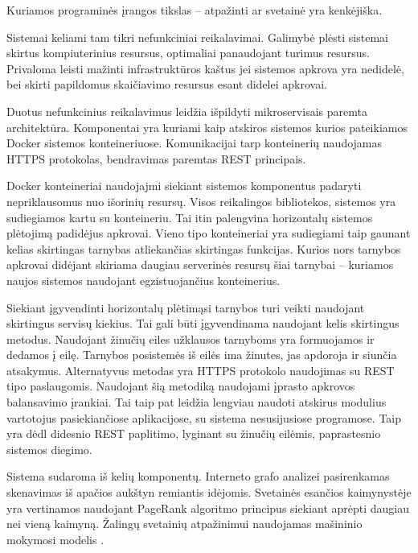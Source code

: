 
Kuriamos programinės įrangos tikslas -- atpažinti ar svetainė yra kenkėjiška.

Sistemai keliami tam tikri nefunkciniai reikalavimai. Galimybė plėsti sistemai skirtus kompiuterinius resursus, optimaliai
panaudojant turimus resursus. Privaloma leisti mažinti infrastruktūros kaštus jei sistemos apkrova yra nedidelė, bei
skirti papildomus skaičiavimo resursus esant didelei apkrovai.

Duotus nefunkcinius reikalavimus leidžia išpildyti mikroservisais paremta architektūra. Komponentai yra kuriami kaip
atskiros sistemos kurios pateikiamos Docker sistemos konteineriuose. Komunikacijai tarp konteinerių naudojamas HTTPS
protokolas, bendravimas paremtas REST principais.

Docker konteineriai naudojajmi siekiant sistemos komponentus padaryti nepriklausomus nuo išorinių resursų. Visos
reikalingos bibliotekos, sistemos yra sudiegiamos kartu su konteineriu. Tai itin palengvina horizontalų sistemos
plėtojimą padidėjus apkrovai. Vieno tipo konteineriai yra sudiegiami taip gaunant kelias skirtingas tarnybas
atliekančias skirtingas funkcijas. Kurios nors tarnybos apkrovai didėjant skiriama daugiau serverinės resursų šiai
tarnybai -- kuriamos naujos sistemos naudojant egzistuojančius konteinerius.

Siekiant įgyvendinti horizontalų plėtimąsi tarnybos turi veikti naudojant skirtingus servisų kiekius. Tai gali būti
įgyvendinama naudojant kelis skirtingus metodus. Naudojant žinučių eiles užklausos tarnyboms yra formuojamos ir dedamos
į eilę. Tarnybos posistemės iš eilės ima žinutes, jas apdoroja ir siunčia atsakymus. Alternatyvus metodas yra HTTPS
protokolo naudojimas su REST tipo paslaugomis. Naudojant šią metodiką naudojami įprasto apkrovos balansavimo įrankiai.
Tai taip pat leidžia lengviau naudoti atskirus modulius vartotojus pasiekiančiose aplikacijose, su sistema nesusijusiose
programose. Taip yra dėdl didesnio REST paplitimo, lyginant su žinučių eilėmis, paprastesnio sistemos diegimo.

Sistema sudaroma iš kelių komponentų. Interneto grafo analizei pasirenkamas skenavimas iš apačios aukštyn
remiantis \cite{webcop} idėjomis. Svetainės esančios kaimynystėje yra vertinamos naudojant PageRank algoritmo
principus \cite{pagerank} siekiant aprėpti daugiau nei vieną kaimyną. Žalingų svetainių atpažinimui naudojamas
mašininio mokymosi modelis \cite{trees}.

\newpage